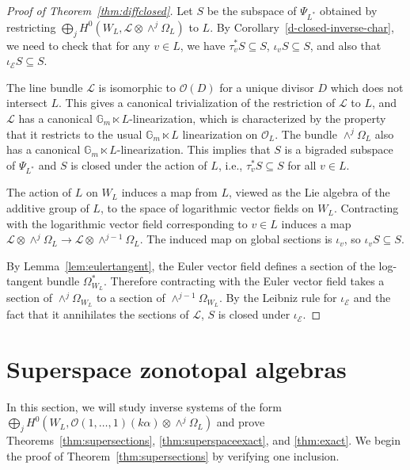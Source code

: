 \documentclass{amsart}
\theoremstyle{definition}
\begin{document}
\begin{proof}[Proof of Theorem~\ref{thm:diffclosed}]
Let $S$ be the subspace of $\Psi_{L^*}$ obtained by restricting $\bigoplus_j H^0(W_L, \mathcal{L} \otimes \wedge^j \Omega_L)$ to $L$. 
By Corollary~\ref{d-closed-inverse-char}, we need to check that for any $v \in L$, we have $\tau_v^* S \subseteq S$, $\iota_v S \subseteq S$, and also that $\iota_{\mathcal{E}} S \subseteq S$. 

The line bundle $\mathcal{L}$ is isomorphic to $\mathcal{O}(D)$ for a unique divisor $D$ which does not intersect $L$. 
This gives a canonical trivialization of the restriction of $\mathcal{L}$ to $L$, and $\mathcal{L}$ has a canonical $\mathbb{G}_m \ltimes L$-linearization, which is characterized by the property that it restricts to the usual $\mathbb{G}_m \ltimes L$ linearization on $\mathcal{O}_L$. The bundle $\wedge^j \Omega_L$ also has a canonical $\mathbb{G}_m \ltimes L$-linearization. This implies that $S$ is a bigraded subspace of $\Psi_{L^*}$ and $S$ is closed under the action of $L$, i.e., $\tau_v^* S \subseteq S$ for all $v \in L$. 

The action of $L$ on $W_L$ induces a map from $L$, viewed as the Lie algebra of the additive group of $L$, to the space of logarithmic vector fields on $W_L$. Contracting with the logarithmic vector field corresponding to $v \in L$ induces a map $\mathcal{L} \otimes \wedge^j \Omega_L \to \mathcal{L} \otimes \wedge^{j-1} \Omega_L$. The induced map on global sections is $\iota_v$, so $\iota_v S \subseteq S$. 


By Lemma~\ref{lem:eulertangent}, the Euler vector field defines a section of the  log-tangent 
bundle $\Omega_{W_L}^*$. Therefore contracting with the Euler vector field 
takes a section of $\wedge^j \Omega_{W_L}$ to a section of 
$\wedge^{j-1} \Omega_{W_L}$. By the Leibniz rule for 
$\iota_{\mathcal{E}}$ and the fact that it annihilates the sections of $\mathcal{L}$, $S$ is closed under $\iota_{\mathcal{E}}$.
\end{proof}


\section{Superspace zonotopal algebras}

In this section, we will study inverse systems of the form $\bigoplus_j H^0(W_L, \mathcal{O}(1, \dotsc, 1)(k\alpha) \otimes \wedge^j \Omega_L)$ and prove Theorems~\ref{thm:supersections}, \ref{thm:superspaceexact}, and \ref{thm:exact}. 
We begin the proof of Theorem~\ref{thm:supersections} by verifying one inclusion. 
\end{document}
